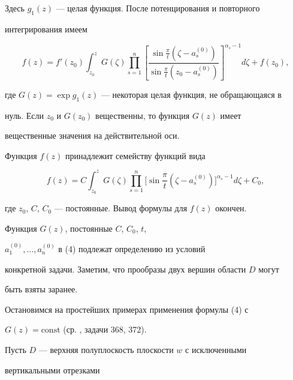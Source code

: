 Здесь $g_1(z)$ --- целая функция. После потенцирования и повторного 


интегрирования имеем 


$$ 


f(z)=f'(z_0)\int^z_{z_0}G(\zeta)\prod^n_{s=1}\left[ 


\frac{\sin\frac{\pi}{t}(\zeta-a^{(0)}_s)} 


{\sin\frac{\pi}{t}(z_0-a^{(0)}_s)}\right]^{\alpha_s-1}d\zeta+ 


f(z_0), 


$$ 


где $G(z)=\exp g_1(z)$ --- некоторая целая функция, не обращающаяся в 


нуль. Если $z_0$ и $G(z_0)$ вещественны, то функция $G(z)$ имеет 


вещественные значения на действительной оси. 


 


Функция $f(z)$ принадлежит семейству функций вида 


\begin{equation} 


f(z)=C\int^z_{z_0}G(\zeta)\prod^n_{s=1} 


\bigg[\sin\frac{\pi}{t}(\zeta-a^{(0)}_s)\bigg]^{\alpha_s-1} 


d\zeta+C_0, 


\end{equation} 


где $z_0$, $C$, $C_0$ --- постоянные. Вывод формулы для $f(z)$ окончен. 


 


Функция $G(z)$, постоянные $C$, $C_0$, $t$, 


$a^{(0)}_1,\dotsc,a^{(0)}_n$ в (4) подлежат определению из условий 


конкретной задачи. Заметим, что прообразы двух вершин области $D$ могут 


быть взяты заранее. 


 


Остановимся на простейших примерах применения формулы (4) с 


$G(z)=\text{const}$ (ср. \cite{3}, задачи 368, 372). 


 


Пусть $D$ --- верхняя полуплоскость плоскости $w$ с исключенными 


вертикальными отрезками 


